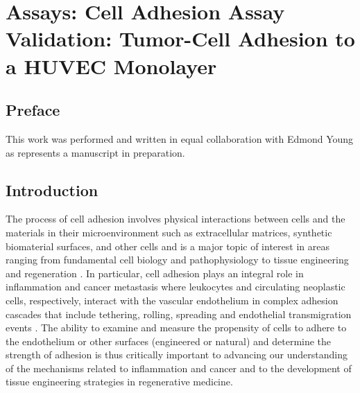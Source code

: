 \chapter{Assays: Cell Adhesion Assay Validation: Tumor-Cell Adhesion to a HUVEC Monolayer}
\label{Chap:TumorCellAdhesion}

\section{Preface}
This work was performed and written in equal collaboration with Edmond Young as represents a manuscript in preparation.

\section{Introduction}
The process of cell adhesion involves physical interactions between cells and the materials in their microenvironment such as extracellular matrices, synthetic biomaterial surfaces, and other cells and is a major topic of interest in areas ranging from fundamental cell biology and pathophysiology \cite{Chen:1997p320,Davies:1995p87} to tissue engineering and regeneration \cite{Nugent:2003p459}. In particular, cell adhesion plays an integral role in inflammation and cancer metastasis where leukocytes and circulating neoplastic cells, respectively, interact with the vascular endothelium in complex adhesion cascades that include tethering, rolling, spreading and endothelial transmigration events \cite{Ley:2007fk,Geiger:2009vn}. The ability to examine and measure the propensity of cells to adhere to the endothelium or other surfaces (engineered or natural) and determine the strength of adhesion is thus critically important to advancing our understanding of the mechanisms related to inflammation and cancer and to the development of tissue engineering strategies in regenerative medicine.


